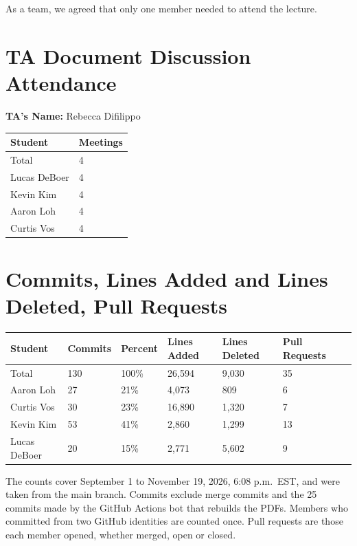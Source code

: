 \documentclass{article}
\begin{document}
As a team, we agreed that only one member needed to attend the lecture.

\section{TA Document Discussion Attendance}

\noindent \textbf{TA's Name: } Rebecca Difilippo

\begin{table}[H]
\centering
\begin{tabular}{ll}
\toprule
\textbf{Student} & \textbf{Meetings}\\
\midrule
Total & 4\\
Lucas DeBoer & 4\\
Kevin Kim & 4\\
Aaron Loh & 4\\
Curtis Vos & 4\\
\bottomrule
\end{tabular}
\end{table}

\section{Commits, Lines Added and Lines Deleted, Pull Requests}

\begin{table}[H]
\centering
\begin{tabular}{lllllll}
\toprule
\textbf{Student} & \textbf{Commits} & \textbf{Percent} & \textbf{Lines Added} &
\textbf{Lines Deleted} & \textbf{Pull Requests}\\
\midrule
Total & 130 & 100\% & 26,594 & 9,030 & 35\\
Aaron Loh & 27 & 21\% & 4,073 & 809 & 6\\
Curtis Vos & 30 & 23\% & 16,890 & 1,320 & 7\\
Kevin Kim & 53 & 41\% & 2,860 & 1,299 & 13\\
Lucas DeBoer & 20 & 15\% & 2,771 & 5,602 & 9\\
\bottomrule
\end{tabular}
\end{table}

The counts cover September 1 to November 19, 2026, 6:08 p.m.\ EST, and were
taken from the main branch. Commits exclude merge commits and the 25 commits
made by the GitHub Actions bot that rebuilds the PDFs. Members who committed
from two GitHub identities are counted once. Pull requests are those each member
opened, whether merged, open or closed.
\end{document}
